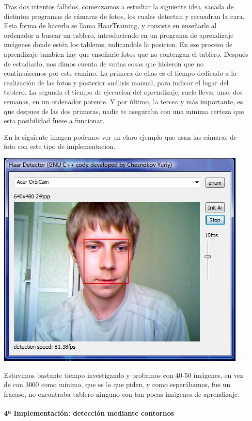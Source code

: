 \documentclass[12pt,a4paper]{report}
\begin{document}
Tras dos intentos fallidos, comenzamos a estudiar la siguiente idea, sacada de
distintos programas de cámaras de fotos, los cuales detectan y recuadran la
cara. Esta forma de hacerlo se llama HaarTraining, y consiste en enseñarle al
ordenador a buscar un tablero, introduciendo en un programa de aprendizaje
imágenes donde estén los tableros, indicandole la posicion. En ese proceso de
aprendizaje tambien hay que enseñarle fotos que no contengan el tablero.
Después de estudiarlo, nos dimos cuenta de varias cosas que hicieron que no
continuásemos por este camino. La primera de ellas es el tiempo dedicado a la
realización de las fotos y posterior análisis manual, para indicar el lugar del
tablero. La segunda el tiempo de ejecucion del aprendizaje, suele llevar unas
dos semanas, en un ordenador potente. Y por último, la tercea y más importante,
es que despues de las dos primeras, nadie te aseguraba con una minima certeza 
que esta posibilidad fuese a funcionar.

En la siguiente imagen podemos ver un claro ejemplo que usan las cámaras de foto
con este tipo de implementacion.

\includegraphics[scale=1]{haartraining.jpg} 

Estuvimos bastante tiempo investigando y probamos con 40-50 imágenes, en vez de
con 3000 como mínimo, que es lo que piden, y como esperábamos, fue un fracaso,
no encontraba tablero ninguno con tan pocas imágenes de aprendizaje. 


\paragraph{4ª Implementación: detección mediante contornos}
\end{document}
